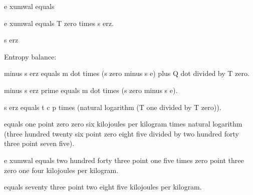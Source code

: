 e xumwal equals

e xumwal equals T zero times s erz.

s erz

Entropy balance:

minus s erz equals m dot times (s zero minus s e) plus Q dot divided by T zero.

minus s erz prime equals m dot times (s zero minus s e).

s erz equals t c p times (natural logarithm (T one divided by T zero)).

equals one point zero zero six kilojoules per kilogram times natural logarithm (three hundred twenty six point zero eight five divided by two hundred forty three point seven five).

e xumwal equals two hundred forty three point one five times zero point three zero one four kilojoules per kilogram.

equals seventy three point two eight five kilojoules per kilogram.